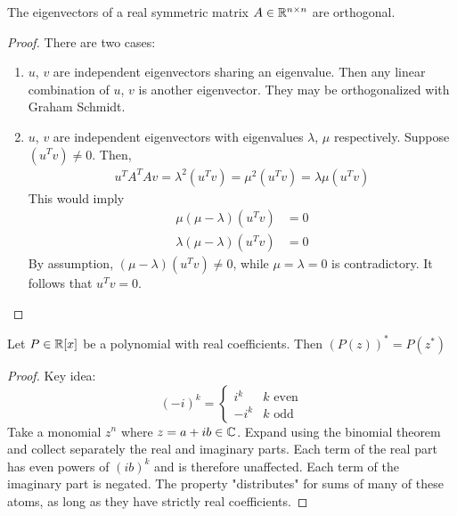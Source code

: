 \documentclass{article}
\begin{document}
\begin{theorem}
The eigenvectors of a real symmetric matrix $A \in {\mathbb R}^{n \times n}$ are orthogonal. 
\end{theorem}
\begin{proof}
There are two cases:
\begin{enumerate}
    \item $u$, $v$ are independent eigenvectors sharing an eigenvalue. Then any linear combination of $u$, $v$ is another eigenvector. They may be orthogonalized with Graham Schmidt. 
    
    \item $u$, $v$ are independent eigenvectors with eigenvalues $\lambda$, $\mu$ respectively. Suppose  $(u^T v) \not = 0$. Then,
    \begin{align}
        u^T A^T A v = \lambda^2 (u^T v) = \mu^2 (u^T v) = \lambda \mu (u^T v)
    \end{align}
    This would imply
    \begin{align}
        \mu(\mu - \lambda) (u^T v) & = 0 \\
        \lambda(\mu - \lambda) (u^T v) & = 0
    \end{align}
    By assumption, $(\mu - \lambda) (u^T v) \not = 0$, while $\mu = \lambda = 0$ is contradictory. It follows that $u^T v = 0$.
\end{enumerate} 
\end{proof}

\begin{lemma} \label{lem:polyconj}
Let $P \in {\mathbb R}[x]$ be a polynomial with real coefficients. Then $(P(z))^* = P(z^*)$
\end{lemma}
\begin{proof}
Key idea: 
\begin{equation} \label{eqn:imag}
    (-i)^k = \begin{cases}
    i^k & k \text{ even} \\
    -i^k & k \text { odd}
    \end{cases}
\end{equation}
Take a monomial $z^n$ where $z = a + ib \in {\mathbb C}$. Expand using the binomial theorem and collect separately the real and imaginary parts. Each term of the real part has even powers of $(ib)^k$ and is therefore unaffected. Each term of the imaginary part is negated. The property "distributes" for sums of many of these atoms, as long as they have strictly real coefficients.
\end{proof}
\end{document}
